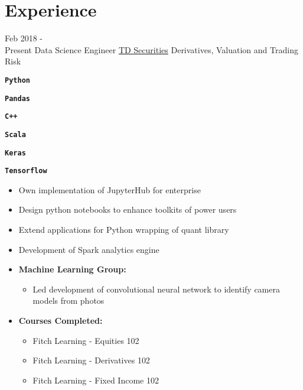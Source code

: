 \documentclass[letterpaper]{twentysecondcv} %
\begin{document}
\makeprofile %

\newcommand{\skill}[1]{\texttt{\textbf{#1}}}


\section{Experience}

\begin{twenty} %

	\twentyitem
		{Feb 2018 - \\ Present}
		{Data Science Engineer}
		{\href{https://www.tdsecurities.com}{TD Securities}}
		{Derivatives, Valuation and Trading Risk}
		{\item\skill{Python}
		\item\skill{Pandas}
		\item\skill{C++}
		\item\skill{Scala}
		\item
		\item\skill{Keras}
		\item\skill{Tensorflow}
		}
		{
			\begin{itemize}
				\item Own implementation of JupyterHub for enterprise
				\item Design python notebooks to enhance toolkits of power users
				\item Extend applications for Python wrapping of quant library
				\item Development of Spark analytics engine
				\item \textbf{Machine Learning Group:}
				\begin{itemize}
					\item Led development of convolutional neural network to identify camera models from photos
				\end{itemize}
				\item \textbf{Courses Completed:}
				\begin{itemize}
					\item Fitch Learning - Equities 102
					\item Fitch Learning - Derivatives 102
					\item Fitch Learning - Fixed Income 102
				\end{itemize}
			\end{itemize}
		}	
		

\end{twenty}
\end{document}
